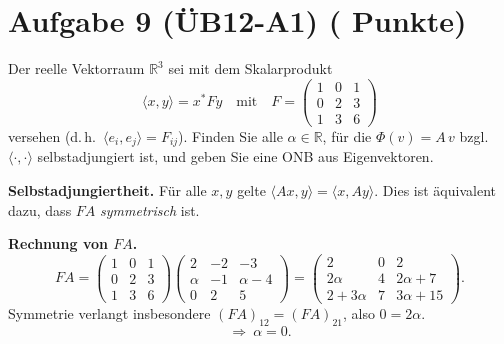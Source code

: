 \documentclass[11pt, a4paper]{article}
\newcommand{\aufgabe}[2]{%
  \section*{\Large\bfseries Aufgabe #1%
  \if\relax\detokenize{#2}\relax\else \hfill\normalfont\normalsize(#2 Punkte)\fi}%
  \vspace{-1.5ex}
}
\begin{document}
\aufgabe{9 (ÜB12-A1)}{}
Der reelle Vektorraum $\mathbb{R}^3$ sei mit dem Skalarprodukt
\[
\langle x,y\rangle = x^\ast F y
\quad\text{mit}\quad
F=
\begin{pmatrix}
1 & 0 & 1\\
0 & 2 & 3\\
1 & 3 & 6
\end{pmatrix}
\]
versehen (d.\,h.\ $\langle e_i,e_j\rangle=F_{ij}$). Finden Sie alle $\alpha\in\mathbb{R}$, für die $\Phi(v)=A\,v$ bzgl.\ $\langle\cdot,\cdot\rangle$ selbstadjungiert ist, und geben Sie eine ONB aus Eigenvektoren.
\begin{framed}
\textbf{Selbstadjungiertheit.}
Für alle $x,y$ gelte $\langle Ax,y\rangle=\langle x,Ay\rangle$.
Dies ist äquivalent dazu, dass $FA$ \emph{symmetrisch} ist.

\medskip
\textbf{Rechnung von $FA$.}
\[
FA
=
\begin{pmatrix}1&0&1\\0&2&3\\1&3&6\end{pmatrix}
\begin{pmatrix}2&-2&-3\\ \alpha&-1&\alpha-4\\ 0&2&5\end{pmatrix}
=
\begin{pmatrix}
2&0&2\\
2\alpha&4&2\alpha+7\\
2+3\alpha&7&3\alpha+15
\end{pmatrix}.
\]
Symmetrie verlangt insbesondere $(FA)_{12}=(FA)_{21}$, also $0=2\alpha$.
\[
\Rightarrow\ \boxed{\alpha=0}.
\]


\end{framed}
\end{document}
